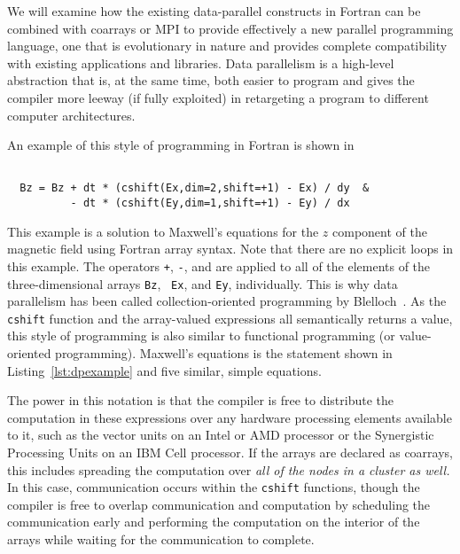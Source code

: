 \documentclass[10pt, conference, compsocconf]{IEEEtran}
\begin{document}
We will examine how the existing data-parallel constructs in Fortran can be
combined with coarrays or MPI to provide effectively a new parallel programming
language, one that is evolutionary in nature and provides complete compatibility
with existing applications and libraries.  Data parallelism is a high-level
abstraction that is, at the same time, both easier to program and gives the
compiler more leeway (if fully exploited) in retargeting a program to different
computer architectures.

An example of this style of programming in Fortran is shown in

\begin{verbatim}

  Bz = Bz + dt * (cshift(Ex,dim=2,shift=+1) - Ex) / dy  &
          - dt * (cshift(Ey,dim=1,shift=+1) - Ey) / dx

\end{verbatim}

This example is a solution to Maxwell's equations for the $z$ component of the
magnetic field using Fortran array syntax.  Note that there are no explicit
loops in this example.  The operators {\tt +}, {\tt -}, and {\tt *} are
applied to all of the elements of the three-dimensional arrays {\tt Bz}, {\tt
  Ex}, and {\tt Ey}, individually.  This is why data parallelism has been
called collection-oriented programming by
Blelloch~\cite{blelloch90,rajopadhyedidlacs}.  As the {\tt cshift} function
and the array-valued expressions all semantically returns a value, this style
of programming is also similar to functional programming (or value-oriented
programming). %
Maxwell's equations is the statement shown in Listing~\ref{lst:dpexample} and
five similar, simple equations.

The power in this notation is that the compiler is free to distribute the
computation in these expressions over any hardware processing elements available
to it, such as the vector units on an Intel or AMD processor or the Synergistic
Processing Units on an IBM Cell processor.  If the arrays are declared as
coarrays, this includes spreading the computation over \emph{all of the nodes in
  a cluster as well.}  In this case, communication occurs within the
\texttt{cshift} functions, though the compiler is free to overlap communication
and computation by scheduling the communication early and performing the
computation on the interior of the arrays while waiting for the communication to
complete.
\end{document}
